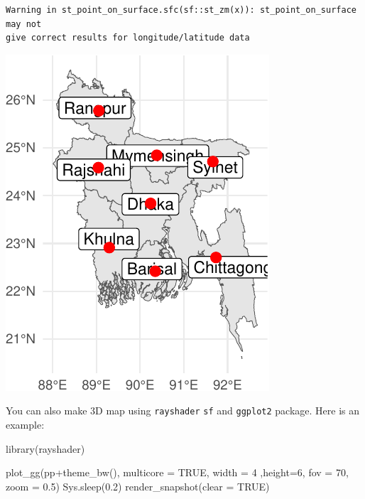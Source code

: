 \documentclass[
  letterpaper,
]{scrbook}
\newenvironment{Shaded}{\begin{snugshade}}{\end{snugshade}}
\newcommand{\AttributeTok}[1]{\textcolor[rgb]{0.40,0.45,0.13}{#1}}
\newcommand{\ConstantTok}[1]{\textcolor[rgb]{0.56,0.35,0.01}{#1}}
\newcommand{\DecValTok}[1]{\textcolor[rgb]{0.68,0.00,0.00}{#1}}
\newcommand{\FloatTok}[1]{\textcolor[rgb]{0.68,0.00,0.00}{#1}}
\newcommand{\FunctionTok}[1]{\textcolor[rgb]{0.28,0.35,0.67}{#1}}
\newcommand{\NormalTok}[1]{\textcolor[rgb]{0.00,0.23,0.31}{#1}}
\newcommand{\SpecialCharTok}[1]{\textcolor[rgb]{0.37,0.37,0.37}{#1}}
\begin{document}
\begin{verbatim}
Warning in st_point_on_surface.sfc(sf::st_zm(x)): st_point_on_surface may not
give correct results for longitude/latitude data
\end{verbatim}

\includegraphics{ch20_files/figure-pdf/unnamed-chunk-2-1.pdf}

You can also make 3D map using \texttt{rayshader} \texttt{sf} and
\texttt{ggplot2} package. Here is an example:

\begin{Shaded}
\begin{Highlighting}[]
\FunctionTok{library}\NormalTok{(rayshader)}

\FunctionTok{plot\_gg}\NormalTok{(pp}\SpecialCharTok{+}\FunctionTok{theme\_bw}\NormalTok{(), }\AttributeTok{multicore =} \ConstantTok{TRUE}\NormalTok{, }\AttributeTok{width =} \DecValTok{4}\NormalTok{ ,}\AttributeTok{height=}\DecValTok{6}\NormalTok{, }\AttributeTok{fov =} \DecValTok{70}\NormalTok{, }\AttributeTok{zoom =} \FloatTok{0.5}\NormalTok{)}
\FunctionTok{Sys.sleep}\NormalTok{(}\FloatTok{0.2}\NormalTok{)}
\FunctionTok{render\_snapshot}\NormalTok{(}\AttributeTok{clear =} \ConstantTok{TRUE}\NormalTok{)}
\end{Highlighting}
\end{Shaded}
\end{document}
